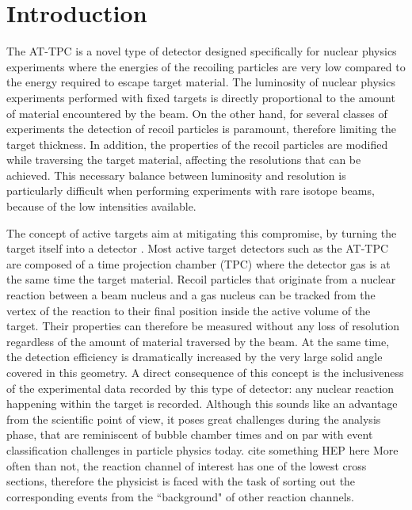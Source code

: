 \documentclass[review,number,sort&compress]{elsarticle}
\begin{document}
\section{Introduction}\label{sec:intro}

%
%   

The AT-TPC \cite{Bradt2017} is a novel type of detector designed specifically for nuclear physics experiments where the energies of the recoiling particles are very low compared to the energy required to escape target material. The luminosity of nuclear physics experiments performed with fixed targets is directly proportional to the amount of material encountered by the beam. On the other hand, for several classes of experiments the detection of recoil particles is paramount, therefore limiting the target thickness. In addition, the properties of the recoil particles are modified while traversing the target material, affecting the resolutions that can be achieved. This necessary balance between luminosity and resolution is particularly difficult when performing experiments with rare isotope beams, because of the low intensities available. 

The concept of active targets aim at mitigating this compromise, by turning the target itself into a detector \cite{Beceiro2018}. Most active target detectors such as the AT-TPC are composed of a time projection chamber (TPC) where the detector gas is at the same time the target material. Recoil particles that originate from a nuclear reaction between a beam nucleus and a gas nucleus can be tracked from the vertex of the reaction to their final position inside the active volume of the target. Their properties can therefore be measured without any loss of resolution regardless of the amount of material traversed by the beam. At the same time, the detection efficiency is dramatically increased by the very large solid angle covered in this geometry. A direct consequence of this concept is the inclusiveness of the experimental data recorded by this type of detector: any nuclear reaction happening within the target is recorded. Although this sounds like an advantage from the scientific point of view, it poses great challenges during the analysis phase, that are reminiscent of bubble chamber times and on par with event classification challenges in particle physics today. {\color{blue} cite something HEP here} More often than not, the reaction channel of interest has one of the lowest cross sections, therefore the physicist is faced with the task of sorting out the corresponding events from the ``background" of other reaction channels. 
\end{document}
